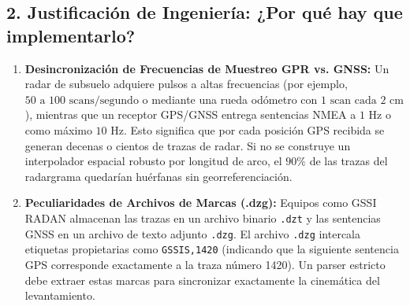 \documentclass[11pt,a4paper]{article}
\begin{document}
\subsection{2. Justificación de Ingeniería: ¿Por qué hay que implementarlo?}
\begin{enumerate}
    \item \textbf{Desincronización de Frecuencias de Muestreo GPR vs. GNSS:}
    Un radar de subsuelo adquiere pulsos a altas frecuencias (por ejemplo, $50\text{ a }100\text{ scans/segundo}$ o mediante una rueda odómetro con $1\text{ scan cada }2\text{ cm}$), mientras que un receptor GPS/GNSS entrega sentencias NMEA a $1\text{ Hz}$ o como máximo $10\text{ Hz}$. Esto significa que por cada posición GPS recibida se generan decenas o cientos de trazas de radar. Si no se construye un interpolador espacial robusto por longitud de arco, el $90\%$ de las trazas del radargrama quedarían huérfanas sin georreferenciación.
    \item \textbf{Peculiaridades de Archivos de Marcas (.dzg):}
    Equipos como GSSI RADAN almacenan las trazas en un archivo binario \texttt{.dzt} y las sentencias GNSS en un archivo de texto adjunto \texttt{.dzg}. El archivo \texttt{.dzg} intercala etiquetas propietarias como \texttt{GSSIS,1420} (indicando que la siguiente sentencia GPS corresponde exactamente a la traza número 1420). Un parser estricto debe extraer estas marcas para sincronizar exactamente la cinemática del levantamiento.
\end{enumerate}
\end{document}
